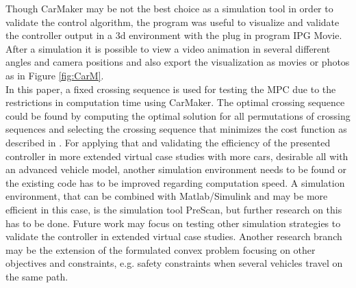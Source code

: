 \documentclass[letterpaper,10pt,conference]{ieeeconf}
\begin{document}
Though CarMaker may be not the best choice as a simulation tool in order to validate the control algorithm, the program was useful to visualize and validate the controller output in a 3d environment with the plug in program IPG Movie. After a simulation it is possible to view a video animation in several different angles and camera positions and also export the visualization as movies or photos as in Figure \ref{fig:CarM}.\\ \indent
In this paper, a fixed crossing sequence is used for testing the MPC due to the restrictions in computation time using CarMaker. The optimal crossing sequence could be found by computing the optimal solution for all permutations of crossing sequences and selecting the crossing sequence that minimizes the cost function as described in \cite{nikolce}. For applying that and validating the efficiency of the presented controller in more extended virtual case studies with more cars, desirable all with an advanced vehicle model, another simulation environment needs to be found or the existing code has to be improved regarding computation speed. A simulation environment, that can be combined with Matlab/Simulink and may be more efficient in this case, is the simulation tool PreScan, but further research on this has to be done. Future work may focus on testing other simulation strategies to validate the controller in extended virtual case studies. Another research branch may be the extension of the formulated convex problem focusing on other objectives and constraints, e.g. safety constraints when several vehicles travel on the same path.

\end{document}
